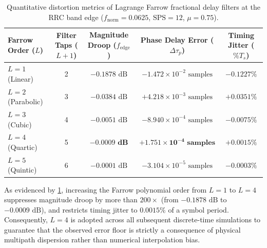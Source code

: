 \documentclass[Markos_Delaportas_1316.tex]{subfiles}
\begin{document}
\begin{table}[htbp]
    \centering
    \caption{Quantitative distortion metrics of Lagrange Farrow
        fractional delay filters at the RRC band edge ($f_{\text{norm}} =
    0.0625$, $\text{SPS} = 12$, $\mu = 0.75$).}
    \label{tab:farrow_order_comparison}
    \begin{tabular}{@{}lcccc@{}}
        \toprule
        \textbf{Farrow Order ($L$)} & \textbf{Filter Taps ($L+1$)} &
        \textbf{Magnitude Droop ($f_{\text{edge}}$)} & \textbf{Phase
        Delay Error ($\Delta \tau_p$)} & \textbf{Timing Jitter ($\% T_s$)} \\
        \midrule
        $L = 1$ (Linear)    & 2 & $-0.1878\text{ dB}$ & $-1.472
        \times 10^{-2}\text{ samples}$ & $-0.1227\%$ \\
        $L = 2$ (Parabolic) & 3 & $-0.0384\text{ dB}$ & $+4.218
        \times 10^{-3}\text{ samples}$ & $+0.0351\%$ \\
        $L = 3$ (Cubic)     & 4 & $-0.0051\text{ dB}$ & $-8.940
        \times 10^{-4}\text{ samples}$ & $-0.0075\%$ \\
        $L = 4$ (Quartic)   & 5 & $\mathbf{-0.0009\text{ dB}}$ &
        $\mathbf{+1.751 \times 10^{-4}\text{ samples}}$ &
        $\mathbf{+0.0015\%}$ \\
        $L = 5$ (Quintic)   & 6 & $-0.0001\text{ dB}$ & $-3.104
        \times 10^{-5}\text{ samples}$ & $-0.0003\%$ \\
        \bottomrule
    \end{tabular}
\end{table}

As evidenced by \cref{tab:farrow_order_comparison}, increasing the
Farrow polynomial order from $L=1$ to $L=4$ suppresses
magnitude droop by more than $200\times$ (from $-0.1878\text{ dB}$ to
$-0.0009\text{ dB}$), and restricts timing jitter to
$0.0015\%$ of a symbol period. Consequently, $L = 4$ is adopted
across all subsequent discrete-time simulations to guarantee
that the observed error floor is strictly a consequence of physical
multipath dispersion rather than numerical interpolation bias.
\end{document}
